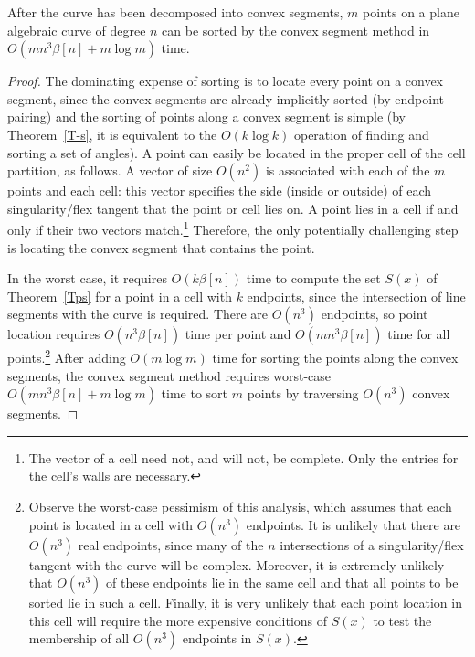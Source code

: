 \begin{theorem}
After the curve has been decomposed into convex segments,
$m$ points on a plane algebraic curve of degree $n$ can be sorted
by the convex segment method in $O(m n^{3} \beta[n] + m\log m)$ time.
\end{theorem}
%
\begin{proof}
The dominating expense of sorting is to locate every point on a convex segment,
since the convex segments are already implicitly sorted (by endpoint pairing) and 
the sorting of points along a convex segment is simple
(by Theorem~\ref{T-s}, it is equivalent to the $O(k \log k)$ operation of finding
and sorting a set of angles). 
A point can easily be located in the proper cell of the cell partition, as follows.
A vector of size $O(n^{2})$ is associated with each of the $m$ points and each
cell: this vector specifies the side (inside or outside) of each singularity/flex tangent
that the point or cell lies on.
A point lies in a cell if and only if their two vectors match.\footnote{The vector
	of a cell need not, and will not, be complete.  Only the entries for the
	cell's walls are necessary.}
Therefore, the only potentially challenging step is locating the convex segment
that contains the point.

In the worst case, it requires $O(k \beta[n])$ time to compute the set 
$S(x)$ of Theorem~\ref{Tps} for a point in a cell with $k$ endpoints, since
the intersection of line segments with the curve is required.
There are $O(n^{3})$ endpoints, so point location requires $O(n^{3}\beta[n])$ time per
point and $O(mn^{3}\beta[n])$ time for all points.\footnote{Observe the worst-case
	pessimism of this analysis, which assumes that each point is located in a cell
	with $O(n^{3})$ endpoints.
	It is unlikely that there are $O(n^{3})$
	real endpoints, since many of the $n$ intersections of a singularity/flex
	tangent with the curve will be complex.  
	Moreover, it is extremely unlikely that $O(n^{3})$
	of these endpoints lie in the same cell and that all points to be sorted
	lie in such a cell.
	Finally, it is very unlikely that each point location in this cell will 
	require the more expensive conditions
	of $S(x)$ to test the membership of all $O(n^{3})$ endpoints in $S(x)$.}
After adding $O(m \log m)$ time for sorting the points along the convex segments,
the convex segment method requires worst-case $O(mn^{3}\beta[n] + m \log m)$ 
time to sort $m$ points by traversing $O(n^{3})$ convex segments.
\end{proof}

